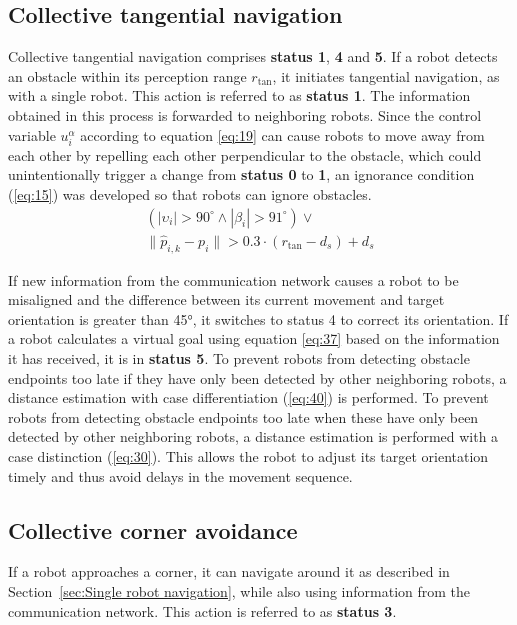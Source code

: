 \documentclass[conference]{IEEEtran}
\begin{document}
\subsection*{Collective tangential navigation}
Collective tangential navigation comprises 
\textbf{status 1}, \textbf{4} and \textbf{5}. If a 
robot detects an obstacle within its perception range \( r_{\mathrm{tan}} \), it initiates 
tangential navigation, as with a single robot. This action is referred to as 
\textbf{status 1}. The information obtained in this process is forwarded to neighboring 
robots.
Since the control variable \( u_i^\alpha \) according to equation \eqref{eq:19} can cause robots 
to move away from each other by repelling each other perpendicular to the obstacle, which could unintentionally 
trigger a change from \textbf{status 0} to \textbf{1}, an 
ignorance condition (\eqref{eq:15}) 
was developed so that robots can ignore obstacles.
\begin{equation}
    \begin{split}
    (|\upsilon_i| > 90^\circ \wedge |\beta_i| > 91^\circ) \vee \\
    \| \hat{p}_{i,k} - p_i \| > 0.3 \cdot (r_{\text{tan}} - d_s) + d_s
    \end{split}
    \label{eq:15}
\end{equation}

If new information from the communication network causes a robot to be 
misaligned and the difference between its current movement 
and target orientation is greater than 45°, it switches to 
status 4 to correct its orientation.
If a robot calculates a virtual goal using equation \eqref{eq:37} based on the information 
it has received, it is in \textbf{status 5}.
To prevent robots from detecting obstacle endpoints too late if they have only been detected 
by other neighboring robots, a distance estimation with case differentiation 
(\eqref{eq:40}) is performed.
To prevent robots from detecting obstacle endpoints too late when these have only 
been detected by other neighboring robots, a distance estimation is performed with 
a case distinction (\eqref{eq:30}). This allows the robot to adjust its target orientation timely and thus avoid delays in the movement sequence.

\subsection*{Collective corner avoidance}
If a robot approaches a corner, it can 
navigate around it as described in Section~\ref{sec:Single robot navigation}, 
while also using information from the communication network. 
This action is referred to as \textbf{status 3}.
\end{document}
